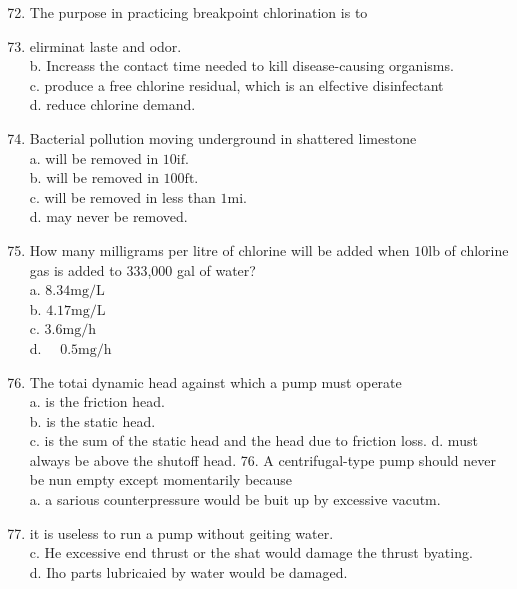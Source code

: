 \documentclass[10pt]{article}
\begin{document}
\begin{enumerate}
  \setcounter{enumi}{71}
  \item The purpose in practicing breakpoint chlorination is to

  \item elirminat laste and odor.\\
b. Increass the contact time needed to kill disease-causing organisms.\\
c. produce a free chlorine residual, which is an elfective disinfectant\\
d. reduce chlorine demand.

  \item Bacterial pollution moving underground in shattered limestone\\
a. will be removed in $10 \mathrm{if}$.\\
b. will be removed in $100 \mathrm{ft}$.\\
c. will be removed in less than $1 \mathrm{mi}$.\\
d. may never be removed.

  \item How many milligrams per litre of chlorine will be added when $10 \mathrm{lb}$ of chlorine gas is added to 333,000 gal of water?\\
a. $8.34 \mathrm{mg} / \mathrm{L}$\\
b. $4.17 \mathrm{mg} / \mathrm{L}$\\
c. $3.6 \mathrm{mg} / \mathrm{h}$\\
d. $\quad 0.5 \mathrm{mg} / \mathrm{h}$

  \item The totai dynamic head against which a pump must operate\\
a. is the friction head.\\
b. is the static head.\\
c. is the sum of the static head and the head due to friction loss. d. must always be above the shutoff head. 76. A centrifugal-type pump should never be nun empty except momentarily because\\
a. a sarious counterpressure would be buit up by excessive vacutm.

  \item it is useless to run a pump without geiting water.\\
c. He excessive end thrust or the shat would damage the thrust byating.\\
d. Iho parts lubricaied by water would be damaged.


\end{enumerate}
\end{document}
